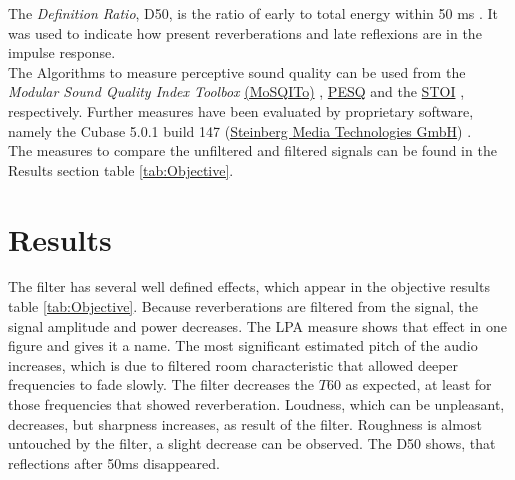\documentclass{article}
\begin{document}
The \textit{Definition Ratio}, D50, is the ratio of early to total energy within 50 ms \cite{HoutgastSteeneken1985}. It was used to indicate how present reverberations and late reflexions are in the impulse response. \\

The Algorithms to measure perceptive sound quality can be used from the \textit{Modular Sound Quality Index Toolbox} \href{https://github.com/Eomys/MoSQITo}{(MoSQITo)} \cite{mosqito} \cite{mosqito2025}, \href{https://github.com/ludlows/python-pesq.git}{PESQ} \cite{pesq2025} and the \href{https://github.com/mpariente/pystoi}{STOI} \cite{stoi2025}, respectively. Further measures have been evaluated by proprietary software, namely the Cubase 5.0.1 build 147 (\href{https://o.steinberg.net/index.php?id=1782&L=1}{Steinberg Media Technologies GmbH}) \cite{cubase501}. \\

The measures to compare the unfiltered and filtered signals can be found in the Results section table \ref{tab:Objective}. 




\section{Results}

The filter has several well defined effects, which appear in the objective results table \ref{tab:Objective}.
Because reverberations are filtered from the signal, the signal amplitude and power decreases. 
The LPA measure shows that effect in one figure and gives it a name.
The most significant estimated pitch of the audio increases, which is due to filtered room characteristic that allowed deeper frequencies to fade slowly.
The filter decreases the $T60$ as expected, at least for those frequencies that showed reverberation.
Loudness, which can be unpleasant, decreases, but sharpness increases, as result of the filter.
Roughness is almost untouched by the filter, a slight decrease can be observed. 
The D50 shows, that reflections after 50ms disappeared.
\end{document}
